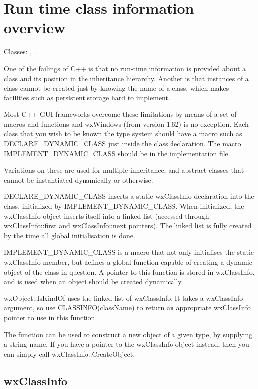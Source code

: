 \section{Run time class information overview}\label{runtimeclassoverview}

Classes: , .

One of the failings of C++ is that no run-time information is provided
about a class and its position in the inheritance hierarchy.
Another is that instances of a class cannot be created just by knowing the name of a class,
which makes facilities such as persistent storage hard to implement.

Most C++ GUI frameworks overcome these limitations by means of a set of
macros and functions and wxWindows (from version 1.62) is no exception.
Each class that you wish to be known the type system should have
a macro such as DECLARE\_DYNAMIC\_CLASS just inside the class declaration.
The macro IMPLEMENT\_DYNAMIC\_CLASS should be in the implementation file.

Variations on these  are used for multiple inheritance, and abstract
classes that cannot be instantiated dynamically or otherwise.

DECLARE\_DYNAMIC\_CLASS inserts a static wxClassInfo declaration into the
class, initialized by IMPLEMENT\_DYNAMIC\_CLASS. When initialized, the
wxClassInfo object inserts itself into a linked list (accessed through
wxClassInfo::first and wxClassInfo::next pointers). The linked list
is fully created by the time all global initialisation is done.

IMPLEMENT\_DYNAMIC\_CLASS is a macro that not only initialises the static
wxClassInfo member, but defines a global function capable of creating a
dynamic object of the class in question. A pointer to this function is
stored in wxClassInfo, and is used when an object should be created
dynamically.

wxObject::IsKindOf uses the linked list of wxClassInfo. It takes
a wxClassInfo argument, so use CLASSINFO(className) to return an
appropriate wxClassInfo pointer to use in this function.

The function  can be used
to construct a new object of a given type, by supplying a string name.
If you have a pointer to the wxClassInfo object instead, then you
can simply call wxClassInfo::CreateObject.

\subsection{wxClassInfo}\label{wxclassinfooverview}

